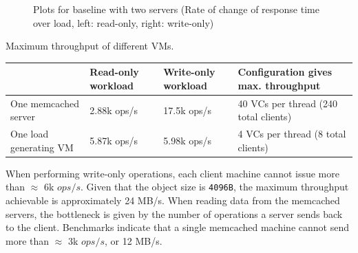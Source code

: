 \documentclass[11pt,a4paper]{article}
\begin{document}
\begin{figure}[!h]
  \centering
  \caption{Plots for baseline with two servers (Rate of change of response time over load, left: read-only, right: write-only)}
  \label{fig:baseline_no_mw_2_server_maxtp}
\end{figure}

\begin{center}
	{Maximum throughput of different VMs.}
	\begin{tabular}{|l|p{2cm}|p{2cm}|p{4cm}|}
		\hline                        & Read-only workload & Write-only workload & Configuration gives max. throughput  \\ 
        \hline One memcached server   & 2.88k ops/s        & 17.5k ops/s         & 40 VCs per thread (240 total clients)\\ 
        \hline One load generating VM & 5.87k ops/s        & 5.98k ops/s         & 4 VCs per thread (8 total clients)   \\  
		\hline 
	\end{tabular}
\end{center}

When performing write-only operations, each client machine cannot issue more than $\approx$ 6k $ops/s$. Given that the object size is \texttt{4096B}, the maximum throughput achievable is approximately 24 MB/s.
When reading data from the memcached servers, the bottleneck is given by the number of operations a server sends back to the client. Benchmarks indicate that a single memcached machine cannot send more than $\approx$ 3k $ops/s$, or 12 MB/s.
\end{document}

